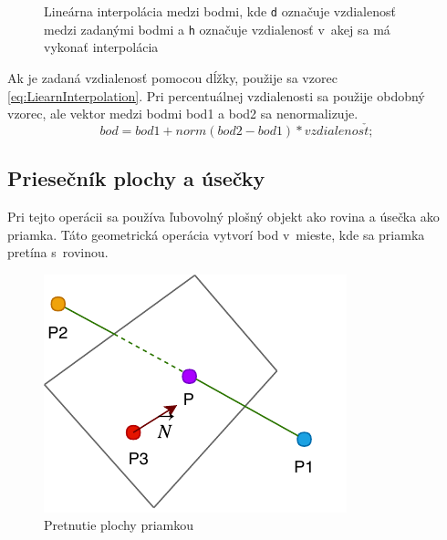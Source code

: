 \begin{figure}[H]
	\centering
	\caption{Lineárna interpolácia medzi bodmi, kde \texttt{d} označuje vzdialenosť medzi zadanými bodmi a  \texttt{h} označuje vzdialenosť v~akej sa má vykonať interpolácia }
	\label{fig:PointLinearInterpolation}
\end{figure}

Ak je zadaná vzdialenosť pomocou dĺžky, použije sa vzorec \ref{eq:LiearnInterpolation}. Pri percentuálnej vzdialenosti sa použije obdobný vzorec, ale vektor medzi bodmi bod1 a bod2 sa nenormalizuje.
\begin{equation}
    bod = bod1 + norm(bod2 - bod1) * vzdialenos\check{t};
	\label{eq:LiearnInterpolation}
\end{equation}


\subsection*{Priesečník plochy a úsečky}

Pri tejto operácii sa používa ľubovolný plošný objekt ako rovina a úsečka ako priamka. Táto geometrická operácia vytvorí bod v~mieste, kde sa priamka pretína s~rovinou. 


\begin{figure}[H]
	\centering
	\includegraphics[height=0.3\textwidth]{obrazky-figures/DP Navrh operacii-Intersection.pdf}
	\caption{Pretnutie plochy priamkou}
	\label{fig:Intersection}
\end{figure}


